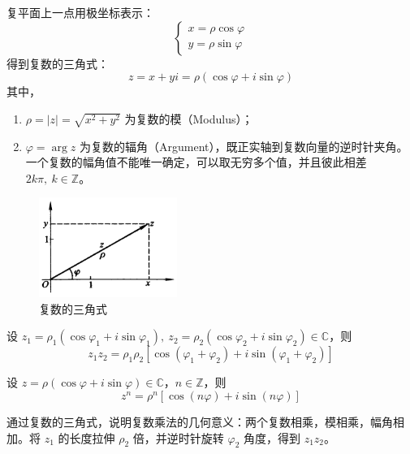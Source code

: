 \begin{definition}[复数的三角式]
    复平面上一点用极坐标表示：
    \[
        \left\{\begin{array}{l} x=\rho \cos \varphi \\ y=\rho \sin \varphi \end{array}\right.
    \]
    得到复数的三角式：
    \begin{equation}
        z = x + yi = \rho (\cos \varphi + i \sin \varphi)
        \label{eq:ComplexPolar}
    \end{equation}
    其中，
    \begin{enumerate}
        \item $\rho = |z| = \sqrt{x^2 + y^2}$ 为复数的模（Modulus）；
        \item $\varphi = \arg z$ 为复数的辐角（Argument），既正实轴到复数向量的逆时针夹角。一个复数的幅角值不能唯一确定，可以取无穷多个值，并且彼此相差 $2k\pi,\ k\in\mathbb{Z}$。
    \end{enumerate}
\end{definition}

\begin{figure}[htbp]
    \centering
    \includegraphics[width=0.4\textwidth]{figures/chapter3/chapter3_4_2} 
    \caption{复数的三角式}
    \label{fig:ComplexPolar}
\end{figure}
\vspace{1em}

\begin{theorem}[复数乘法的三角式]
    设 $z_1=\rho_1(\cos\varphi_1 + i\sin\varphi_1),\ z_2=\rho_2(\cos\varphi_2 + i\sin\varphi_2)\in\mathbb{C}$，则
    \[
        z_1 z_2 = \rho_1 \rho_2 [\cos(\varphi_1 + \varphi_2) + i \sin(\varphi_1 + \varphi_2)]
    \]
\end{theorem}

\begin{corollary}
    设 $z=\rho(\cos\varphi + i\sin\varphi)\in\mathbb{C}$，$n\in\mathbb{Z}$，则
    \begin{equation}
        z^n = \rho^n [\cos(n\varphi) + i \sin(n\varphi)]
        \label{eq:DeMoivreTheorem}
    \end{equation}
\end{corollary}
\vspace{1em}
\begin{note}
    通过复数的三角式，说明复数乘法的几何意义：两个复数相乘，模相乘，幅角相加。将 $z_1$ 的长度拉伸 $\rho_2$ 倍，并逆时针旋转 $\varphi_2$ 角度，得到 $z_1 z_2$。
\end{note}
\vspace{1em}

